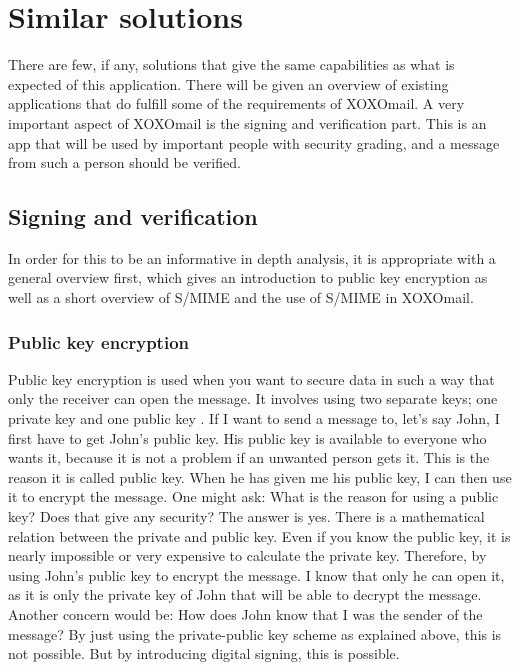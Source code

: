 

\section{Similar solutions}
There are few, if any, solutions that give the same capabilities as what is expected of this application. There will be given an overview of existing applications that do fulfill some of the requirements of XOXOmail.
\newline
\newline
A very important aspect of XOXOmail is the signing and verification part. This is an app that will be used by important people with security grading, and a message from such a person should be verified.

\subsection{Signing and verification}
In order for this to be an informative in depth analysis, it is appropriate with a general overview first, which gives an introduction to public key encryption as well as a short overview of S/MIME and the use of S/MIME in XOXOmail.

\subsubsection{Public key encryption}
Public key encryption is used when you want to secure data in such a way that only the receiver can open the message. It involves using two separate keys; one private key and one public key \cite{bib:pke}.
\newline
\newline
If I want to send a message to, let's say John, I first have to get John's public key. His public key is available to everyone who wants it, because it is not a problem if an unwanted person gets it. This is the reason it is called public key. When he has given me his public key, I can then use it to encrypt the message. One might ask: What is the reason for using a
public key? Does that give any security? The answer is yes. There is a mathematical relation between the private and public key. Even if you know the public key, it is nearly impossible or very expensive to calculate the private key. Therefore, by using John's public key to encrypt the message. I know that only he can open it, as it is only the private key of John that will be able to decrypt the message.
\newline
\newline
Another concern would be: How does John know that I was the sender of the message? By just using the private-public key scheme as explained above, this is not possible. But by introducing digital signing, this is possible.

